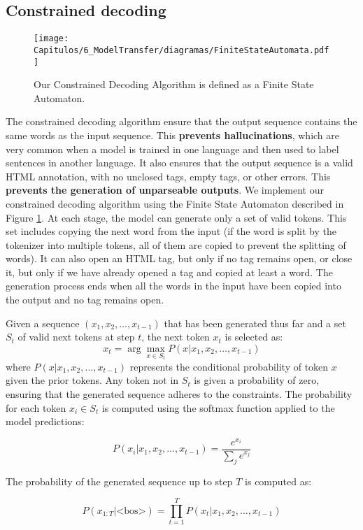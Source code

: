 \subsection{Constrained decoding}
\begin{figure}[htb]
    \centering
    \texttt{[image: Capitulos/6\_ModelTransfer/diagramas/FiniteStateAutomata.pdf]}
    \caption{Our Constrained Decoding Algorithm is defined as a Finite State Automaton.}
    \label{fig6:automaton}
\end{figure}

The constrained decoding algorithm ensure that the output sequence contains the same words as the input sequence. This \textbf{prevents hallucinations}, which are very common when a model is trained in one language and then used to label sentences in another language. It also ensures that the output sequence is a valid HTML annotation, with no unclosed tags, empty tags, or other errors. This \textbf{prevents the generation of unparseable outputs}. We implement our constrained decoding algorithm using the Finite State Automaton described in Figure \ref{fig6:automaton}. At each stage, the model can generate only a set of valid tokens. This set includes copying the next word from the input (if the word is split by the tokenizer into multiple tokens, all of them are copied to prevent the splitting of words). It can also open an HTML tag, but only if no tag remains open, or close it, but only if we have already opened a tag and copied at least a word. The generation process ends when all the words in the input have been copied into the output and no tag remains open.

Given a sequence \((x_1, x_2, \dots, x_{t-1})\) that has been generated thus far and a set \(S_t\) of valid next tokens at step \(t\), the next token \(x_t\) is selected as:
\[ x_t = \arg \max_{x \in S_t} P(x|x_1, x_2, \ldots, x_{t-1}) \]
where \(P(x|x_1, x_2, \dots, x_{t-1})\) represents the conditional probability of token \(x\) given the prior tokens. Any token not in \(S_t\) is given a probability of zero, ensuring that the generated sequence adheres to the constraints. The probability for each token \(x_i \in S_t\) is computed using the softmax function applied to the model predictions:

\[
P(x_i|x_1, x_2, \ldots, x_{t-1}) = \frac{e^{x_i}}{\sum_j e^{x_j}}
\]

The probability of the generated sequence up to step \(T\) is computed as:

\[
P(x_{1:T}|\textrm{<bos>}) = \prod_{t=1}^{T} P(x_t|x_1, x_2, \ldots, x_{t-1})
\]


